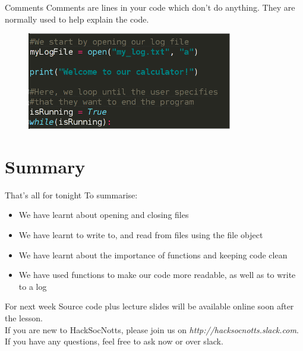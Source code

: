 \documentclass{beamer}
\begin{document}
\begin{frame}{Comments}
Comments are lines in your code which don't do anything.
\pause
They are normally used to help explain the code.
\end{frame}

\begin{frame}
\begin{figure}[h]
\includegraphics[width=0.8\textwidth]{comment}
\end{figure}
\end{frame}

\section{Summary}

\begin{frame}{That's all for tonight}
  To summarise:
  \pause
  \begin{itemize}
  \item We have learnt about opening and closing files
  \pause
  \item We have learnt to write to, and read from files using the file object
  \pause
  \item We have learnt about the importance of functions and keeping code clean
  \pause
  \item We have used functions to make our code more readable, as well as to write to a log
  \end{itemize}
\end{frame}

\begin{frame}{For next week}
Source code plus lecture slides will be available online soon after the lesson.\\
If you are new to HackSocNotts, please join us on \textit{http://hacksocnotts.slack.com}.\\
If you have any questions, feel free to ask now or over slack.\\
\end{frame}
\end{document}
